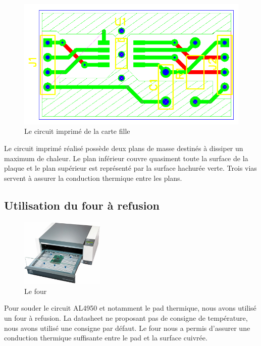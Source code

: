 \documentclass[11pt, french]{article} %
\begin{document}
\begin{figure}[ht!]
	\centering
	\includegraphics[width = 15cm]{SolutionAnalogique/Layout.png}
	\caption{Le circuit imprimé de la carte fille}
\end{figure}

Le circuit imprimé réalisé possède deux plans de masse destinés à dissiper un maximum de chaleur. Le plan inférieur couvre quasiment toute la surface de la plaque et le plan supérieur est représenté par la surface hachurée verte. Trois vias servent à assurer la conduction thermique entre les plans.

\subsection{Utilisation du four à refusion}
\begin{figure}
	\includegraphics[width = 4cm]{SolutionAnalogique/fourarefusion.jpg}
	\caption{Le four}
\end{figure}

Pour souder le circuit AL4950 et notamment le pad thermique, nous avons utilisé un four à refusion. La datasheet ne proposant pas de consigne de température, nous avons utilisé une consigne par défaut. Le four nous a permis d'assurer une conduction thermique suffisante entre le pad et la surface cuivrée. 
\end{document}

